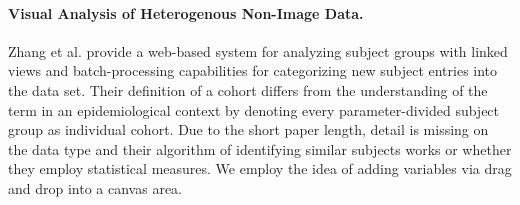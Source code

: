 \documentclass[journal]{style/vgtc} 			          %
\newcommand{\add}[1]{\textcolor{blue}{\uline{#1}}}
\begin{document}
\paragraph{Visual Analysis of Heterogenous Non-Image Data.}
Zhang et al. \cite{Zhang2012} provide a web-based system for analyzing subject groups with linked views and batch-processing capabilities for categorizing new subject entries into the data set.
%
Their definition of a cohort differs from the understanding of the term in an epidemiological context by denoting every parameter-divided subject group as individual cohort.
%
Due to the short paper length, detail is missing on the data type and their algorithm of identifying similar subjects works or whether they employ statistical measures.
%
We employ the idea of adding variables via drag and drop into a canvas area.
\end{document}
